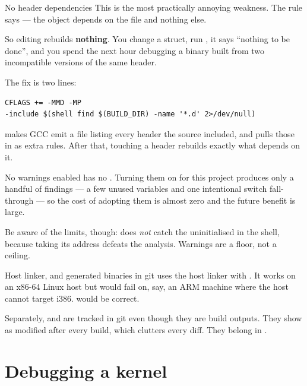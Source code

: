 \begin{danger}{No header dependencies}
This is the most practically annoying weakness. The rule says  ---
the object depends on the  file and nothing else.

So editing  rebuilds \textbf{nothing}. You change a struct, run
, it says ``nothing to be done'', and you spend the next hour debugging a binary built
from two incompatible versions of the same header.

The fix is two lines:
\begin{lstlisting}[style=mk]
CFLAGS += -MMD -MP
-include $(shell find $(BUILD_DIR) -name '*.d' 2>/dev/null)
\end{lstlisting}
 makes GCC emit a  file listing every header the source included, and 
pulls those in as extra rules. After that, touching a header rebuilds exactly what depends on it.
\end{danger}

\begin{warn}{No warnings enabled}
 has no . Turning them on for this project produces only a handful of
findings --- a few unused variables and one intentional switch fall-through --- so the cost of
adopting them is almost zero and the future benefit is large.

Be aware of the limits, though:  does \emph{not} catch the uninitialised
 in the shell, because taking its address defeats the analysis. Warnings are a
floor, not a ceiling.
\end{warn}

\begin{warn}{Host linker, and generated binaries in git}
 uses the host linker with . It works on an x86-64 Linux host but
would fail on, say, an ARM machine where the host  cannot target i386. 
would be correct.

Separately,  and  are tracked in
git even though they are build outputs. They show as modified after every build, which clutters every
diff. They belong in .
\end{warn}

\chapter{Debugging a kernel}

